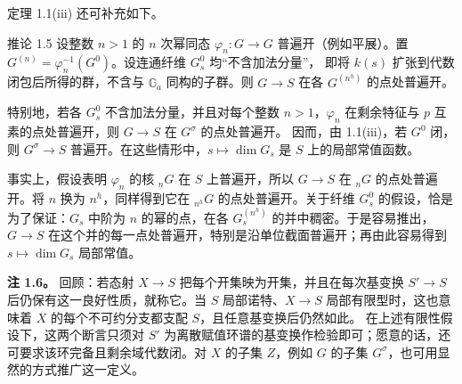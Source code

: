 定理 1.1(iii) 还可补充如下。
\begin{statement}{推论 1.5}
设整数 $n>1$ 的 $n$ 次幂同态 $\varphi_n\colon G\to G$ 普遍开（例如平展）。置 $G^{(n)}=\varphi_n^{-1}(G^0)$。设连通纤维 $G_s^0$ 均“不含加法分量”，
即将 $k(s)$ 扩张到代数闭包后所得的群，不含与 $\mathbb G_a$ 同构的子群。则 $G\to S$ 在各 $G^{(n^h)}$ 的点处普遍开。

特别地，若各 $G_s^0$ 不含加法分量，并且对每个整数 $n>1$，$\varphi_n$ 在剩余特征与 $p$ 互素的点处普遍开，则 $G\to S$ 在 $G^\sigma$ 的点处普遍开。 因而，由 1.1(iii)，若 $G^0$ 闭，则 $G^\sigma\to S$ 普遍开。在这些情形中，$s\mapsto\dim G_s$ 是 $S$ 上的局部常值函数。
\end{statement}

事实上，假设表明 $\varphi_n$ 的核 ${}_nG$ 在 $S$ 上普遍开，所以 $G\to S$ 在 ${}_nG$ 的点处普遍开。将 $n$ 换为 $n^h$，同样得到它在 ${}_{n^h}G$ 的点处普遍开。关于纤维 $G_s^0$ 的假设，恰是为了保证：$G_s$ 中阶为 $n$ 的幂的点，在各 $G_s^{(n^h)}$ 的并中稠密。于是容易推出，$G\to S$ 在这个并的每一点处普遍开，特别是沿单位截面普遍开；再由此容易得到 $s\mapsto\dim G_s$ 局部常值。

\textbf{注 1.6。} 回顾：若态射 $X\to S$ 把每个开集映为开集，并且在每次基变换 $S'\to S$ 后仍保有这一良好性质，就称它。当 $S$ 局部诺特、$X\to S$ 局部有限型时，这也意味着 $X$ 的每个不可约分支都支配 $S$，且任意基变换后仍然如此。
在上述有限性假设下，这两个断言只须对 $S'$ 为离散赋值环谱的基变换作检验即可；愿意的话，还可要求该环完备且剩余域代数闭。对 $X$ 的子集 $Z$，例如 $G$ 的子集 $G^\sigma$，也可用显然的方式推广这一定义。

